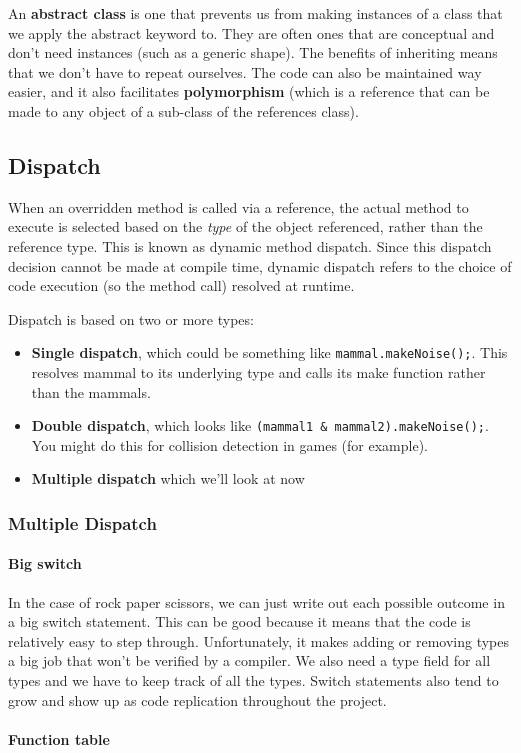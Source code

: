 \documentclass[11pt,a4paper,titlepage,dvipsnames,cmyk]{scrartcl}
\begin{document}
An \textbf{abstract class} is one that prevents us from making instances
of a class that we apply the abstract keyword to. They are often ones that
are conceptual and don't need instances (such as a generic shape). The
benefits of inheriting means that we don't have to repeat ourselves. The
code can also be maintained way easier, and it also facilitates
\textbf{polymorphism} (which is a reference that can be made to any object
of a sub-class of the references class).

\subsection{Dispatch}%
\label{sub:Dispatch}
When an overridden method is called via a reference, the actual method to
execute is selected based on the \textit{type} of the object referenced,
rather than the reference type. This is known as dynamic method dispatch.
Since this dispatch decision cannot be made at compile time, dynamic
dispatch refers to the choice of code execution (so the method call)
resolved at runtime.

Dispatch is based on two or more types:

\begin{itemize}
    \item \textbf{Single dispatch}, which could be something like
        \lstinline|mammal.makeNoise();|. This resolves mammal to its
        underlying type and calls its make function rather than the
        mammals.
    \item \textbf{Double dispatch}, which looks like \lstinline|(mammal1 & mammal2).makeNoise();|. You might do this for collision detection
        in games (for example).
    \item \textbf{Multiple dispatch} which we'll look at now
\end{itemize}

\subsubsection{Multiple Dispatch}%
\label{ssub:Multiple Dispatch}


\paragraph{Big switch}%
\label{par:Big switch}

In the case of rock paper scissors, we can just write out each possible
outcome in a big switch statement. This can be good because it means that
the code is relatively easy to step through. Unfortunately, it makes
adding or removing types a big job that won't be verified by a compiler.
We also need a type field for all types and we have to keep track of all
the types. Switch statements also tend to grow and show up as code
replication throughout the project.

\paragraph{Function table}%
\label{par:Function table}
\end{document}
